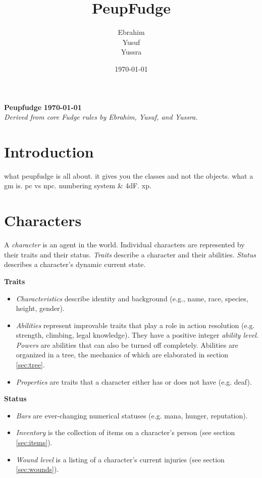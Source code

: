 \documentclass[12pt]{article}
\title{PeupFudge}
\author{Ebrahim \\ Yusuf \\ Yussra}
\date{\today}
\newcommand{\notes}[1]{{\color{Tan} #1}}
\begin{document}
\textbf{Peupfudge}
\hfill
\textbf{\today}\\
\textit{Derived from core Fudge rules by Ebrahim, Yusuf, and Yussra.}

\section{Introduction}
\notes{what peupfudge is all about. it gives you the classes and not the objects. what a gm is. pc vs npc. numbering system \& 4dF. xp.}

\section{Characters}
A \emph{character} is an agent in the world.
Individual characters are represented by their traits and their status.
\emph{Traits} describe a character and their abilities.
\emph{Status} describes a character's dynamic current state.

\textbf{Traits}\vspace{-6mm}
\begin{itemize}
\item \emph{Characteristics}
describe identity and background
(e.g., name, race, species, height, gender).
\item \emph{Abilities}
represent improvable traits that play a role in action resolution
(e.g. strength, climbing, legal knowledge).
They have a positive integer \emph{ability level}.
\emph{Powers} are abilities that can also be turned off completely.
Abilities are organized in a tree, the mechanics of which are elaborated in section \ref{sec:tree}.
\item \emph{Properties} are traits that a character either has or does not have (e.g. deaf).
\end{itemize}

\textbf{Status}\vspace{-6mm}
\begin{itemize}
\item \emph{Bars} are ever-changing numerical statuses (e.g. mana, hunger, reputation).
\item \emph{Inventory} is the collection of items on a character's person (see section \ref{sec:items}).
\item \emph{Wound level} is a listing of a character's current injuries (see section \ref{sec:wounds}).
\end{itemize}
\end{document}
